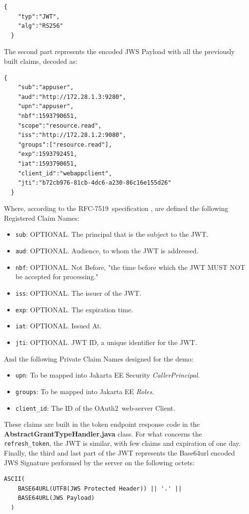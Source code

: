 \documentclass[a4paper,12pt]{article}
\def\oauth{OAuth2\xspace}
\def\rfc#1{RFC-#1\xspace}
\begin{document}
\begin{lstlisting}[basicstyle=\ttfamily]
  {
    "typ":"JWT",
    "alg":"RS256"
  }
\end{lstlisting}

The second part represents the encoded JWS Payload with all the previously built claims, decoded as:

\begin{lstlisting}[basicstyle=\ttfamily]
  {
    "sub":"appuser",
    "aud":"http://172.28.1.3:9280",
    "upn":"appuser",
    "nbf":1593790651,
    "scope":"resource.read",
    "iss":"http://172.28.1.2:9080",
    "groups":["resource.read"],
    "exp":1593792451,
    "iat":1593790651,
    "client_id":"webappclient",
    "jti":"b72cb976-81cb-4dc6-a230-86c16e155d26"
  }
\end{lstlisting}

Where, according to the \rfc{7519}\ specification \cite{RFC7519}, are defined the following Registered Claim Names:

\begin{itemize}
    \item \texttt{sub}: OPTIONAL. The principal that is the subject to the JWT.
    \item \texttt{aud}: OPTIONAL. Audience, to whom the JWT is addressed.
    \item \texttt{nbf}: OPTIONAL. Not Before, "the time before which the JWT MUST NOT be accepted for processing." \cite{RFC7519}
    \item \texttt{iss}: OPTIONAL. The issuer of the JWT.
    \item \texttt{exp}: OPTIONAL. The expiration time.
    \item \texttt{iat}: OPTIONAL. Issued At.
    \item \texttt{jti}: OPTIONAL. JWT ID, a unique identifier for the JWT.
\end{itemize}

And the following Private Claim Names designed for the demo:

\begin{itemize}
    \item \texttt{upn}: To be mapped into Jakarta EE Security \textit{CallerPrincipal}.
    \item \texttt{groups}: To be mapped into Jakarta EE \textit{Roles}.
    \item \texttt{client\_id}: The ID of the \oauth\ web-server Client.
\end{itemize}

These claims are built in the token endpoint response code in the \textbf{AbstractGrantTypeHandler.java} class. For what concerns the \texttt{refresh\_token}, the JWT is similar, with few claims and expiration of one day.
Finally, the third and last part of the JWT represents the Base64url encoded JWS Signature performed by the server on the following octets:
\begin{lstlisting}[basicstyle=\ttfamily]
  ASCII(
    BASE64URL(UTF8(JWS Protected Header)) || '.' ||
    BASE64URL(JWS Payload)
  )
\end{lstlisting}
\end{document}

